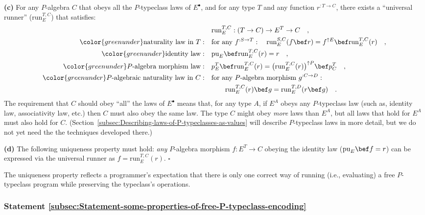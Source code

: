 \textbf{(c)} For any $P$-algebra $C$ that obeys all the $P$-typeclass
laws of $E^{\bullet}$, and for any type $T$ and any function $r^{:T\rightarrow C}$,
there exists a \textsf{``}universal runner\textsf{''} ($\text{run}_{E}^{T,C}$) that
satisfies:
\begin{align}
 & \text{run}_{E}^{T,C}:(T\rightarrow C)\rightarrow E^{T}\rightarrow C\quad,\nonumber \\
{\color{greenunder}\text{naturality law in }T:}\quad & \text{for any }f^{:S\rightarrow T}:\quad\text{run}_{E}^{S,C}(f\bef r)=f^{\uparrow E}\bef\text{run}_{E}^{T,C}(r)\quad,\label{eq:free-typeclass-encoding-naturality-law}\\
{\color{greenunder}\text{identity law}:}\quad & \text{pu}_{E}\bef\text{run}_{E}^{T,C}(r)=r\quad,\label{eq:free-typeclass-encoding-identity-law}\\
{\color{greenunder}P\text{-algebra morphism law}:}\quad & p_{E}^{T}\bef\text{run}_{E}^{T,C}(r)=\big(\text{run}_{E}^{T,C}(r)\big)^{\uparrow P}\bef p_{C}^{T}\quad,\nonumber \\
{\color{greenunder}P\text{-algebraic naturality law in }C:}\quad & \text{for any }P\text{-algebra morphism }g^{:C\rightarrow D}:\nonumber \\
 & \quad\quad\text{run}_{E}^{T,C}(r)\bef g=\text{run}_{E}^{T,D}(r\bef g)\quad.\label{eq:free-typeclass-encoding-P-algebraic-naturality-law}
\end{align}
The requirement that $C$ should obey \textsf{``}all\textsf{''} the laws of $E^{\bullet}$
means that, for any type $A$, if $E^{A}$ obeys any $P$-typeclass
law (such as, identity law, associativity law, etc.) then $C$ must
also obey the same law. The type $C$ might obey \emph{more} laws
than $E^{A}$, but all laws that hold for $E^{A}$ must also hold
for $C$. (Section~\ref{subsec:Describing-laws-of-P-typeclasses-as-values}
will describe $P$-typeclass laws in more detail, but we do not yet
need the the techniques developed there.)

\textbf{(d)} The following uniqueness property must hold: \emph{any}
$P$-algebra morphism $f:E^{T}\rightarrow C$ obeying the identity
law ($\text{pu}_{E}\bef f=r$) can be expressed via the universal
runner as $f=\text{run}_{E}^{T,C}(r)$. $\square$

The uniqueness property reflects a programmer\textsf{'}s expectation that there
is only one correct way of running (i.e., evaluating) a free $P$-typeclass
program while preserving the typeclass\textsf{'}s operations.

\subsubsection{Statement \label{subsec:Statement-some-properties-of-free-P-typeclass-encoding}\ref{subsec:Statement-some-properties-of-free-P-typeclass-encoding}}

